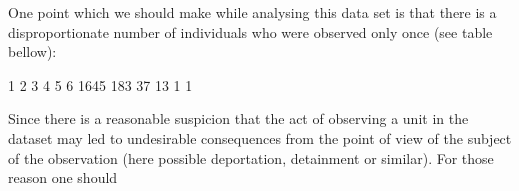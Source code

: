 \documentclass[
]{jss}
\newcommand{\1}{\mathcal{I}} \newcommand{\bx}{\boldsymbol{x}}
\begin{document}
One point which we should make while analysing this data set is that
there is a disproportionate number of individuals who were observed only
once (see table bellow):

\begin{CodeChunk}
\begin{CodeOutput}

   1    2    3    4    5    6 
1645  183   37   13    1    1 
\end{CodeOutput}
\end{CodeChunk}

Since there is a reasonable suspicion that the act of observing a unit
in the dataset may led to undesirable consequences from the point of
view of the subject of the observation (here possible deportation,
detainment or similar). For those reason one should
\end{document}
